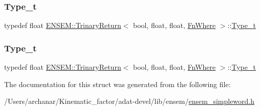 \mbox{\label{structENSEM_1_1TrinaryReturn_3_01bool_00_01float_00_01float_00_01FnWhere_01_4_a1e5c651d668076e9bbd52f373bc583bd}} 
\subsubsection{\texorpdfstring{Type\_t}{Type\_t}\hspace{0.1cm}{\footnotesize\ttfamily [2/3]}}
{\footnotesize\ttfamily typedef float \mbox{\hyperlink{structENSEM_1_1TrinaryReturn}{E\+N\+S\+E\+M\+::\+Trinary\+Return}}$<$ bool, float, float, \mbox{\hyperlink{structENSEM_1_1FnWhere}{Fn\+Where}} $>$\+::\mbox{\hyperlink{structENSEM_1_1TrinaryReturn_3_01bool_00_01float_00_01float_00_01FnWhere_01_4_a1e5c651d668076e9bbd52f373bc583bd}{Type\+\_\+t}}}

\mbox{\label{structENSEM_1_1TrinaryReturn_3_01bool_00_01float_00_01float_00_01FnWhere_01_4_a1e5c651d668076e9bbd52f373bc583bd}} 
\subsubsection{\texorpdfstring{Type\_t}{Type\_t}\hspace{0.1cm}{\footnotesize\ttfamily [3/3]}}
{\footnotesize\ttfamily typedef float \mbox{\hyperlink{structENSEM_1_1TrinaryReturn}{E\+N\+S\+E\+M\+::\+Trinary\+Return}}$<$ bool, float, float, \mbox{\hyperlink{structENSEM_1_1FnWhere}{Fn\+Where}} $>$\+::\mbox{\hyperlink{structENSEM_1_1TrinaryReturn_3_01bool_00_01float_00_01float_00_01FnWhere_01_4_a1e5c651d668076e9bbd52f373bc583bd}{Type\+\_\+t}}}



The documentation for this struct was generated from the following file\+:\begin{DoxyCompactItemize}
\item 
/\+Users/archanar/\+Kinematic\+\_\+factor/adat-\/devel/lib/ensem/\mbox{\hyperlink{adat-devel_2lib_2ensem_2ensem__simpleword_8h}{ensem\+\_\+simpleword.\+h}}\end{DoxyCompactItemize}
